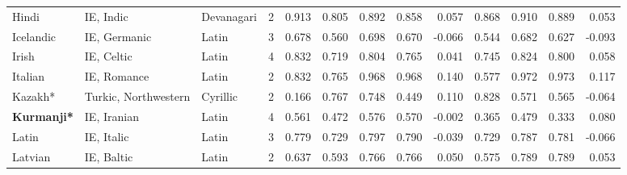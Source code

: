 \begin{tabular}{lllrrrrrrrrrr}
                          Hindi &                       IE, Indic & Devanagari &         2 &                       0.913 &                         0.805 &         0.892 &                  0.858 &            0.057 &                         0.868 &         0.910 &                  0.889 &            0.053 \\
                      Icelandic &                    IE, Germanic &      Latin &         3 &                       0.678 &                         0.560 &         0.698 &                  0.670 &           -0.066 &                         0.544 &         0.682 &                  0.627 &           -0.093 \\
                          Irish &                      IE, Celtic &      Latin &         4 &                       0.832 &                         0.719 &         0.804 &                  0.765 &            0.041 &                         0.745 &         0.824 &                  0.800 &            0.058 \\
                        Italian &                     IE, Romance &      Latin &         2 &                       0.832 &                         0.765 &         0.968 &                  0.968 &            0.140 &                         0.577 &         0.972 &                  0.973 &            0.117 \\
                        Kazakh* &            Turkic, Northwestern &   Cyrillic &         2 &                       0.166 &                         0.767 &         0.748 &                  0.449 &            0.110 &                         0.828 &         0.571 &                  0.565 &           -0.064 \\
             \textbf{Kurmanji*} &                     IE, Iranian &      Latin &         4 &                       0.561 &                         0.472 &         0.576 &                  0.570 &           -0.002 &                         0.365 &         0.479 &                  0.333 &            0.080 \\
                          Latin &                      IE, Italic &      Latin &         3 &                       0.779 &                         0.729 &         0.797 &                  0.790 &           -0.039 &                         0.729 &         0.787 &                  0.781 &           -0.066 \\
                        Latvian &                      IE, Baltic &      Latin &         2 &                       0.637 &                         0.593 &         0.766 &                  0.766 &            0.050 &                         0.575 &         0.789 &                  0.789 &            0.053 \\

\end{tabular}
